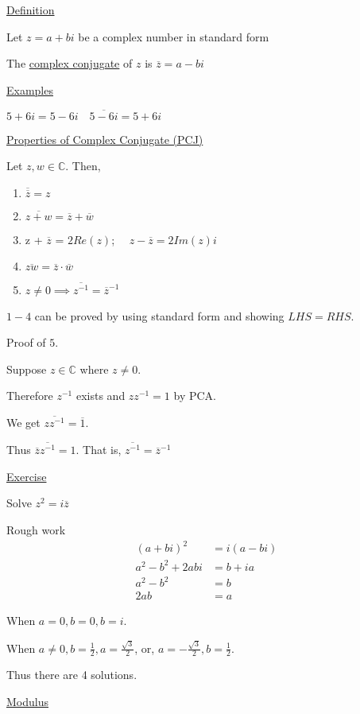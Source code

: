 \documentclass{article}
\begin{document}
\underline{Definition}

Let $z = a + bi$ be a complex number in standard form

The \underline{complex conjugate} of $z$ is $\overline{z} = a-bi$

\underline{Examples}

$5 + 6i = 5-6i \quad \overline{5-6i} = 5+6i$


\underline{Properties of Complex Conjugate (PCJ)}

Let $z,w \in \mathbb{C}$. Then,
\begin{enumerate}
    \item $\overline{\overline{z}} = z$
    \item $\overline{z + w} = \overline{z} + \overline{w}$
    \item z + $\overline{z}$ = $2Re(z)$; $\quad z - \overline{z} = 2Im(z)i$
    \item $\overline{zw} = \overline{z} \cdot \overline{w}$
    \item $z \ne 0 \implies \overline{z^{-1}} = \overline{z}^{-1}$
\end{enumerate}

$1 - 4$ can be proved by using standard form and showing $LHS = RHS$. 

Proof of $5$. 

Suppose $z \in \mathbb{C}$ where $z \ne 0$.

Therefore $z^{-1}$ exists and $zz^{-1} = 1$ by PCA. 

We get $\overline{zz^{-1}} = \overline{1}$.

Thus $\overline{z}\overline{z^{-1}} = 1$. That is, $\overline{z^{-1}} = \overline{z}^{-1}$

\underline{Exercise}

Solve $z^2 = i\overline{z}$

Rough work
\begin{align*}
    (a + bi)^2 &= i(a-bi)\\
    a^2 - b^2 + 2abi &= b + ia\\
    a^2 - b^2 &= b\\
    2ab &= a
\end{align*}

When $a = 0, b = 0, b = i$.

When $a \ne 0, b = \frac{1}{2}, a = \frac{\sqrt{3}}{2}$, or, $a = -\frac{\sqrt{3}}{2}, b = \frac{1}{2}$.

Thus there are 4 solutions. 


\underline{Modulus}
\end{document}
